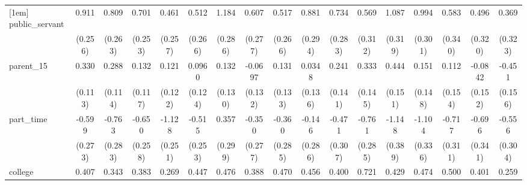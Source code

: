 {\begin{tabular}{l*{16}{c}}
[1em]
public\_servant      &       0.911\sym{***}&       0.809\sym{**} &       0.701\sym{**} &       0.461         &       0.512         &       1.184\sym{***}&       0.607\sym{*}  &       0.517         &       0.881\sym{**} &       0.734\sym{**} &       0.569         &       1.087\sym{***}&       0.994\sym{***}&       0.583         &       0.496         &       0.369         \\
                    &     (0.256)         &     (0.263)         &     (0.253)         &     (0.257)         &     (0.266)         &     (0.286)         &     (0.277)         &     (0.266)         &     (0.294)         &     (0.283)         &     (0.312)         &     (0.319)         &     (0.301)         &     (0.340)         &     (0.320)         &     (0.323)         \\
[1em]
parent\_15           &       0.330\sym{**} &       0.288\sym{*}  &       0.132         &       0.121         &      0.0960         &       0.132         &     -0.0697         &       0.131         &      0.0348         &       0.241         &       0.333\sym{*}  &       0.444\sym{**} &       0.151         &       0.112         &     -0.0842         &      -0.451\sym{**} \\
                    &     (0.113)         &     (0.114)         &     (0.117)         &     (0.122)         &     (0.124)         &     (0.130)         &     (0.132)         &     (0.133)         &     (0.136)         &     (0.141)         &     (0.145)         &     (0.151)         &     (0.148)         &     (0.154)         &     (0.152)         &     (0.156)         \\
[1em]
part\_time           &      -0.599\sym{*}  &      -0.763\sym{**} &      -0.650\sym{*}  &      -1.128\sym{***}&      -0.515\sym{*}  &       0.357         &      -0.350         &      -0.360         &      -0.146         &      -0.471         &      -0.761\sym{**} &      -1.148\sym{**} &      -1.104\sym{**} &      -0.717\sym{*}  &      -0.696\sym{*}  &      -0.556         \\
                    &     (0.273)         &     (0.283)         &     (0.258)         &     (0.251)         &     (0.253)         &     (0.299)         &     (0.277)         &     (0.285)         &     (0.286)         &     (0.307)         &     (0.285)         &     (0.389)         &     (0.336)         &     (0.311)         &     (0.341)         &     (0.304)         \\
[1em]
college             &       0.407\sym{**} &       0.343\sym{*}  &       0.383\sym{**} &       0.269\sym{*}  &       0.447\sym{**} &       0.476\sym{**} &       0.388\sym{**} &       0.470\sym{**} &       0.456\sym{**} &       0.400\sym{*}  &       0.721\sym{***}&       0.429\sym{*}  &       0.474\sym{**} &       0.500\sym{**} &       0.401\sym{*}  &       0.259         \\

\end{tabular}}

